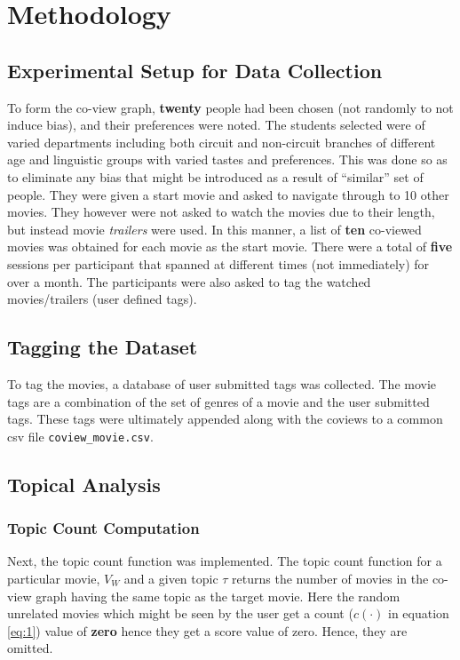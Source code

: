 \chapter{Methodology}

\section{Experimental Setup for Data Collection}

To form the co-view graph, \textbf{twenty} people had been chosen (not randomly to not induce bias), and their preferences were noted. The students selected were of varied departments including both circuit and non-circuit branches of different age and linguistic groups with varied tastes and preferences. This was done so as to eliminate any bias that might be introduced as a result of ``similar'' set of people. They were given a start movie and asked to navigate through to 10 other movies. They however were not asked to watch the movies due to their length, but instead movie \textit{trailers} were used. In this manner, a list of \textbf{ten} co-viewed movies was obtained for each movie as the start movie. There were a total of \textbf{five} sessions per participant that spanned at different times (not immediately) for over a month. The participants were also asked to tag the watched movies/trailers (user defined tags).

\section{Tagging the Dataset}
To tag the movies, a database of user submitted tags was collected. The movie tags are a combination of the set of genres of a movie and the user submitted tags. These tags were ultimately appended along with the coviews to a common csv file \texttt{coview\_movie.csv}.

\section{Topical Analysis}
\subsection{Topic Count Computation}

Next, the topic count function was implemented. The topic count function for a particular movie, $V_W$ and a given topic $\tau$ returns the number of movies in the co-view graph having the same topic as the target movie. Here the random unrelated movies which might be seen by the user get a count ($c(\cdot)$ in equation \ref{eq:1}) value of \textbf{zero} hence they get a score value of zero. Hence, they are omitted.

